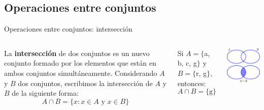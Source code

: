 \documentclass[9pt, aspectratio=169]{beamer}
\begin{document}
\subsection{Operaciones entre conjuntos}

\begin{frame}{Operaciones entre conjuntos: intersección}
\begin{columns}[c]
\cx
\begin{definition}
    La \textbf{intersección} de dos conjuntos es un nuevo conjunto formado por los elementos que están en ambos conjuntos simultáneamente. Considerando $A$ y $B$ dos conjuntos, escribimos la intersección de $A$ y $B$ de la siguiente forma:
    \[ A \cap B = \{ x : x \in A \text{ y } x \in B \} \]
\end{definition}

\begin{example}
    Si $A = \{$a, b, c, g$\}$ y $B = \{$r, g$\}$, entonces:
    \[ A \cap B = \{\text{g} \} \]
\end{example}

\cx
\begin{center}
    \includegraphics[scale=1.0]{figs/fig-03.pdf}
\end{center}
\end{columns}
\end{frame}
\end{document}
